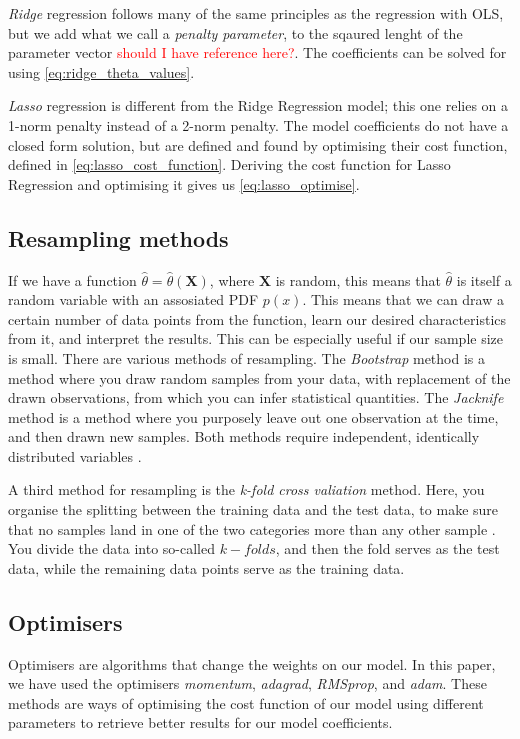  \textit{Ridge} regression follows many of the same principles as the regression with OLS, but we add what we call a \textit{penalty parameter}, to the sqaured lenght of the parameter vector \textcolor{red}{should I have reference here?}. The coefficients can be solved for using \autoref{eq:ridge_theta_values}.


 \textit{Lasso} regression is different from the Ridge Regression model; this one relies on a 1-norm penalty instead of a 2-norm penalty. The model coefficients do not have a closed form solution, but are defined and found by optimising their cost function, defined in \autoref{eq:lasso_cost_function}. Deriving the cost function for Lasso Regression and optimising it gives us \autoref{eq:lasso_optimise}.  


 \subsection{Resampling methods}
 If we have a function $\hat{\theta} = \hat{\theta}(\mathbf{X})$, where $\mathbf{X}$ is random, this means that $\hat{\theta}$ is itself a random variable with an assosiated PDF $p(x)$\cite{noauthor_machinelearninguiodocbookmllecturebookpdf_nodate}. This means that we can draw a certain number of data points from the function, learn our desired characteristics from it, and interpret the results. This can be especially useful if our sample size is small. There are various methods of resampling. The \textit{Bootstrap} method is a method where you draw random samples from your data, with replacement of the drawn observations, from which you can infer statistical quantities. The \textit{Jacknife} method is a method where you purposely leave out one observation at the time, and then drawn new samples. Both methods require independent, identically distributed variables \cite{noauthor_machinelearninguiodocbookmllecturebookpdf_nodate}.

A third method for resampling is the \textit{k-fold cross valiation} method. Here, you organise the splitting between the training data and the test data, to make sure that no samples land in one of the two categories more than any other sample \cite{noauthor_machinelearninguiodocbookmllecturebookpdf_nodate}. You divide the data into so-called $k-folds$, and then the fold serves as the test data, while the remaining data points serve as the training data. 


 \subsection{Optimisers}
 Optimisers are algorithms that change the weights on our model. In this paper, we have used the optimisers \textit{momentum}, \textit{adagrad}, \textit{RMSprop}, and \textit{adam}. These methods are ways of optimising the cost function of our model using different parameters to retrieve better results for our model coefficients.\\ 

